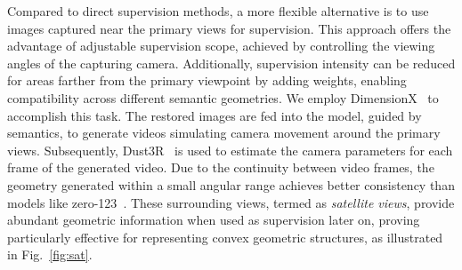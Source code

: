 Compared to direct supervision methods, a more flexible alternative is to use images captured near the primary views for supervision. This approach offers the advantage of adjustable supervision scope, achieved by controlling the viewing angles of the capturing camera. Additionally, supervision intensity can be reduced for areas farther from the primary viewpoint by adding weights, enabling compatibility across different semantic geometries. We employ DimensionX~\cite{sun2024dimensionx} to accomplish this task. The restored images are fed into the model, guided by semantics, to generate videos simulating camera movement around the primary views. Subsequently, Dust3R~\cite{dust3r} is used to estimate the camera parameters for each frame of the generated video. Due to the continuity between video frames, the geometry generated within a small angular range achieves better consistency than models like zero-123~\cite{liu2023zero1to3}. These surrounding views, termed as \textit{satellite views}, provide abundant geometric information when used as supervision later on, proving particularly effective for representing convex geometric structures, as illustrated in Fig.~\ref{fig:sat}.


